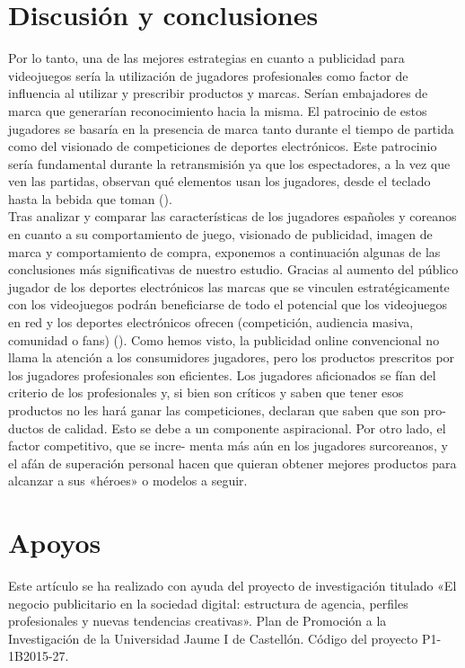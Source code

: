 \documentclass[a4paper,11pt]{article}
\begin{document}
\section{Discusión y conclusiones}
Por lo tanto, una de las mejores estrategias en cuanto a publicidad para videojuegos sería la utilización de jugadores profesionales como factor de influencia al utilizar y prescribir productos y marcas. Serían embajadores de marca que generarían reconocimiento hacia la misma. El patrocinio de estos jugadores se basaría en la presencia de marca tanto durante el tiempo de partida como del visionado de competiciones de deportes electrónicos. Este patrocinio sería fundamental durante la retransmisión ya que los espectadores, a la vez que ven las partidas, observan qué elementos usan los jugadores, desde el teclado hasta la bebida que toman (\cite{Agarwal2016}).\\
Tras analizar y comparar las características de los jugadores españoles y coreanos en cuanto a su comportamiento de juego, visionado de publicidad, imagen de marca y comportamiento de compra, exponemos a continuación algunas de las conclusiones más significativas de nuestro estudio.
Gracias al aumento del público jugador de los deportes electrónicos las marcas que se vinculen estratégicamente con los videojuegos podrán beneficiarse de todo el potencial que los videojuegos en red y los deportes electrónicos ofrecen (competición, audiencia masiva, comunidad o fans) (\cite{Erik2015}). Como hemos visto, la publicidad online convencional no llama la atención a los consumidores jugadores, pero los productos prescritos por los jugadores profesionales son eficientes. Los jugadores aficionados se fían del criterio de los profesionales y, si bien  son críticos y saben que tener esos productos no les hará ganar las competiciones, declaran que saben que son pro- ductos de calidad. Esto se debe a un componente aspiracional. Por otro lado, el factor competitivo, que se incre- menta más aún en los jugadores surcoreanos, y el afán de superación personal hacen que quieran obtener mejores productos para alcanzar a sus «héroes» o modelos a seguir.\\

\section{Apoyos}
Este artículo se ha realizado con ayuda del proyecto de investigación titulado «El negocio publicitario en la sociedad digital: estructura de agencia, perfiles profesionales y nuevas tendencias creativas». Plan de Promoción a la Investigación de la Universidad Jaume I de Castellón. Código del proyecto P1-1B2015-27.

   


\end{document}
